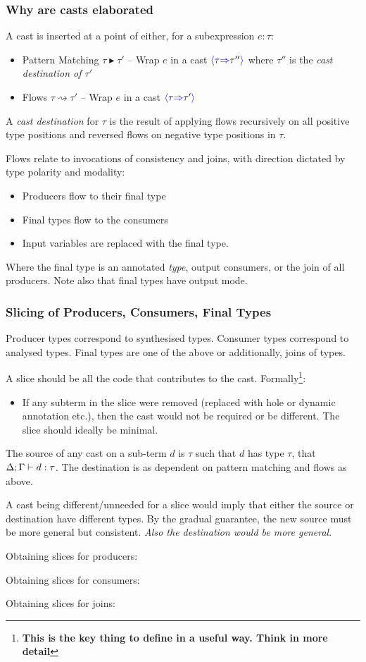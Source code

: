 \subsubsection{Why are casts elaborated}
A cast is inserted at a point of either, for a subexpression $e : \tau$:
\begin{itemize}
\item Pattern Matching $\tau \blacktriangleright \tau'$ -- Wrap $e$ in a cast ${\color{blue}\langle} \tau {\color{blue}\Rightarrow} \tau'' {\color{blue}\rangle}$ where $\tau''$ is the \textit{cast destination of $\tau'$}
\item  Flows $\tau \rightsquigarrow \tau'$ -- Wrap $e$ in a cast ${\color{blue}\langle} \tau {\color{blue}\Rightarrow} \tau' {\color{blue}\rangle}$
\end{itemize}
A \textit{cast destination} for $\tau$ is the result of applying flows recursively on all positive type positions and reversed flows on negative type positions in $\tau$.\par
Flows relate to invocations of consistency and joins, with direction dictated by type polarity and modality:
\begin{itemize}
\item Producers flow to their final type 
\item Final types flow to the consumers
\item Input variables are replaced with the final type.
\end{itemize}
Where the final type is an annotated \textit{type}, output consumers, or the join of all producers. Note also that final types have output mode.
\par 

\subsubsection{Slicing of Producers, Consumers, Final Types}
Producer types correspond to synthesised types. Consumer types correspond to analysed types. Final types are one of the above or additionally, joins of types.\par 
A slice should be all the code that contributes to the cast. Formally\footnote{\textbf{This is the key thing to define in a useful way. Think in more detail}}:
\begin{itemize}
\item If any subterm in the slice were removed (replaced with hole or dynamic annotation etc.), then the cast would not be required or be different. The slice should ideally be minimal.
\end{itemize}
The source of any cast on a sub-term $d$ is $\tau$ such that $d$ has type $\tau$, that $\Delta;\Gamma \vdash d : \tau$. The destination is as dependent on pattern matching and flows as above. \par 
A cast being different/unneeded for a slice would imply that either the source or destination have different types. By the gradual guarantee, the new source must be more general but consistent. \textit{Also the destination would be more general}.\par 
Obtaining slices for producers:\par 
Obtaining slices for consumers:\par 
Obtaining slices for joins:\par 


